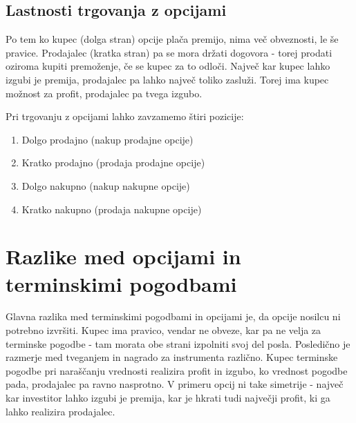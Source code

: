 \documentclass[a4paper]{article}
\begin{document}
\subsection{Lastnosti trgovanja z opcijami}
Po tem ko kupec (dolga stran) opcije plača premijo, nima več obveznosti, le še pravice. Prodajalec (kratka stran) pa se mora držati dogovora - torej prodati
oziroma kupiti premoženje, če se kupec za to odloči. Največ kar kupec lahko izgubi je premija,
prodajalec pa lahko največ toliko zasluži. Torej ima kupec možnost za profit, prodajalec pa tvega izgubo.

Pri trgovanju z opcijami lahko zavzamemo štiri pozicije:
\begin{enumerate}
    \item Dolgo prodajno (nakup prodajne opcije)
    \item Kratko prodajno (prodaja prodajne opcije)
    \item Dolgo nakupno (nakup nakupne opcije)
    \item Kratko nakupno (prodaja nakupne opcije)
\end{enumerate}

\section{Razlike med opcijami in terminskimi pogodbami}
Glavna razlika med terminskimi pogodbami in opcijami je, da opcije nosilcu ni potrebno izvršiti. Kupec ima pravico,
vendar ne obveze, kar pa ne velja za terminske pogodbe - tam morata obe strani izpolniti svoj del posla.
Posledično je razmerje med tveganjem in nagrado za instrumenta različno. Kupec terminske pogodbe pri naraščanju vrednosti
realizira profit in izgubo, ko vrednost pogodbe pada, prodajalec pa ravno nasprotno. V primeru
opcij ni take simetrije - največ kar investitor lahko izgubi je premija, kar je hkrati tudi največji profit, ki ga lahko realizira prodajalec.
\end{document}
